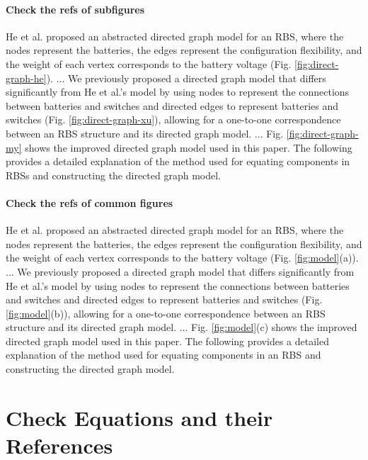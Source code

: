 \documentclass[a4paper]{article}
\begin{document}
\paragraph{Check the refs of subfigures}
He et al. \cite{heExploringAdaptiveReconfiguration2013} proposed an abstracted directed graph model for an RBS, where the nodes represent the batteries, the edges represent the configuration flexibility, and the weight of each vertex corresponds to the battery voltage (Fig. \ref{fig:direct-graph-he}). 
...
We previously proposed a directed graph model that differs significantly from He et al.'s model by using nodes to represent the connections between batteries and switches and directed edges to represent batteries and switches (Fig. \ref{fig:direct-graph-xu}), allowing for a one-to-one correspondence between an RBS structure and its directed graph model. 
...
Fig. \ref{fig:direct-graph-my} shows the improved directed graph model used in this paper.
The following provides a detailed explanation of the method used for equating components in RBSs and constructing the directed graph model.

\paragraph{Check the refs of common figures}
He et al. \cite{heExploringAdaptiveReconfiguration2013} proposed an abstracted directed graph model for an RBS, where the nodes represent the batteries, the edges represent the configuration flexibility, and the weight of each vertex corresponds to the battery voltage (Fig. \ref{fig:model}(a)). 
...
We previously proposed a directed graph model that differs significantly from He et al.'s model by using nodes to represent the connections between batteries and switches and directed edges to represent batteries and switches (Fig. \ref{fig:model}(b)), allowing for a one-to-one correspondence between an RBS structure and its directed graph model. 
...
Fig. \ref{fig:model}(c) shows the improved directed graph model used in this paper.
The following provides a detailed explanation of the method used for equating components in an RBS and constructing the directed graph model.

\section{Check Equations and their References}
\end{document}
